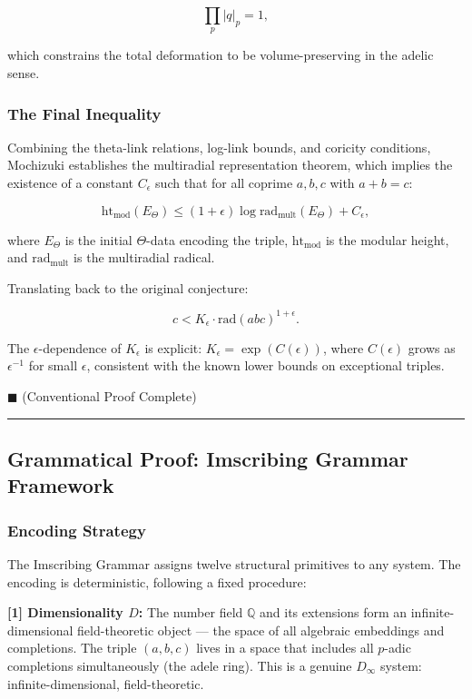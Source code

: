 \documentclass[12pt,a4paper]{article}
\begin{document}
\[\prod_p |q|_p = 1,\]

which constrains the total deformation to be volume-preserving in the adelic sense.

\subsubsection{The Final Inequality}

Combining the theta-link relations, log-link bounds, and coricity conditions, Mochizuki establishes the multiradial representation theorem, which implies the existence of a constant $C_{\epsilon}$ such that for all coprime $a, b, c$ with $a + b = c$:

\[\text{ht}_{\text{mod}}(E_{\Theta}) \leq (1 + \epsilon) \log \text{rad}_{\text{mult}}(E_{\Theta}) + C_{\epsilon},\]

where $E_{\Theta}$ is the initial $\Theta$-data encoding the triple, $\text{ht}_{\text{mod}}$ is the modular height, and $\text{rad}_{\text{mult}}$ is the multiradial radical.

Translating back to the original conjecture:

\[c < K_{\epsilon} \cdot \text{rad}(abc)^{1+\epsilon}.\]

The $\epsilon$-dependence of $K_{\epsilon}$ is explicit: $K_{\epsilon} = \exp(C(\epsilon))$, where $C(\epsilon)$ grows as $\epsilon^{-1}$ for small $\epsilon$, consistent with the known lower bounds on exceptional triples.

$\blacksquare$ (Conventional Proof Complete)

\begin{center}
\rule{0.5\textwidth}{0.4pt}
\end{center}

\subsection{Grammatical Proof: Imscribing Grammar Framework}

\subsubsection{Encoding Strategy}

The Imscribing Grammar assigns twelve structural primitives to any system. The encoding is deterministic, following a fixed procedure:

\textbf{{[}1{]} Dimensionality $D$:} The number field $\mathbb{Q}$ and its extensions form an infinite-dimensional field-theoretic object --- the space of all algebraic embeddings and completions. The triple $(a, b, c)$ lives in a space that includes all $p$-adic completions simultaneously (the adele ring). This is a genuine $D_{\infty}$ system: infinite-dimensional, field-theoretic.
\end{document}
